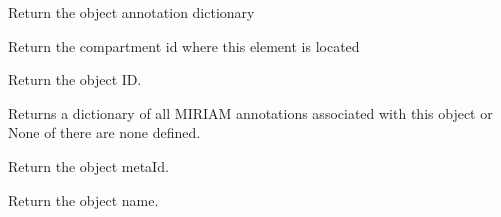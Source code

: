 \documentclass[a4paper,11pt,english]{sphinxmanual}
\begin{document}
\begin{fulllineitems}

\begin{fulllineitems}
\label{modules_doc:cbmpy.CBModel.Fbase.getAnnotations}
Return the object annotation dictionary

\end{fulllineitems}


\begin{fulllineitems}
\label{modules_doc:cbmpy.CBModel.Fbase.getCompartmentId}
Return the compartment id where this element is located

\end{fulllineitems}


\begin{fulllineitems}
\label{modules_doc:cbmpy.CBModel.Fbase.getId}
Return the object ID.

\end{fulllineitems}


\begin{fulllineitems}
\label{modules_doc:cbmpy.CBModel.Fbase.getMIRIAMannotations}
Returns a dictionary of all MIRIAM annotations associated with this object
or None of there are none defined.

\end{fulllineitems}


\begin{fulllineitems}
\label{modules_doc:cbmpy.CBModel.Fbase.getMetaId}
Return the object metaId.

\end{fulllineitems}


\begin{fulllineitems}
\label{modules_doc:cbmpy.CBModel.Fbase.getName}
Return the object name.


\end{fulllineitems}
\end{fulllineitems}
\end{document}
